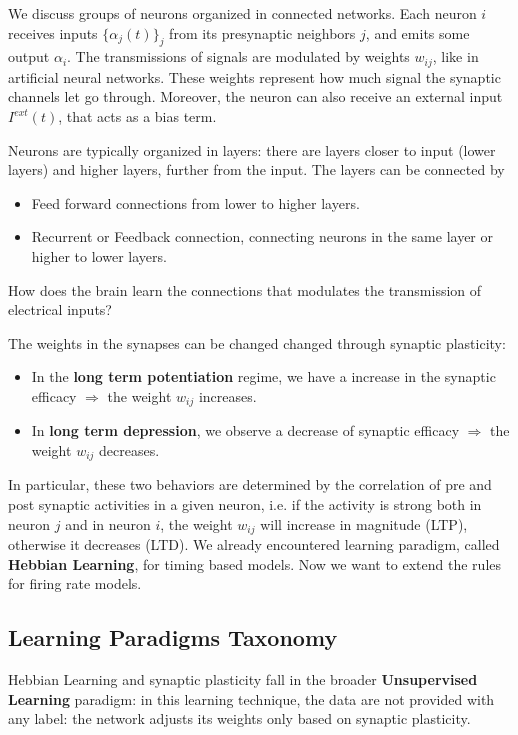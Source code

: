 \documentclass[oneside]{book}
\theoremstyle{definition}
\theoremstyle{plain}
\begin{document}
We discuss groups of neurons organized in connected networks. Each neuron $i$ receives inputs $\{\alpha_j(t)\}_{j}$ from its presynaptic neighbors $j$, and emits some output $\alpha_{i}$.
The transmissions of signals are modulated by weights $w_{ij}$, like in artificial neural networks. These weights represent how much signal the synaptic channels let go through. Moreover, the neuron can also receive an external input $I^{ext}(t)$, that acts as a bias term.

Neurons are typically organized in layers: there are layers closer to input (lower layers) and higher layers, further from the input. 
The layers can be connected by
\begin{itemize}
    \item Feed forward connections from lower to higher layers.
    \item Recurrent or Feedback connection, connecting neurons in the same layer or higher to lower layers.
\end{itemize}
How does the brain learn the connections that modulates the transmission of electrical inputs?

The weights in the synapses can be changed changed through synaptic plasticity:
\begin{itemize}
    \item In the\textbf{ long term potentiation} regime, we have a increase in the synaptic efficacy $\Rightarrow$ the weight $w_{ij}$ increases.
    \item In \textbf{long term depression}, we observe a decrease of synaptic efficacy $\Rightarrow$ the weight $w_{ij}$ decreases.

\end{itemize}
In particular, these two behaviors are determined by the correlation of pre and post synaptic activities in a given neuron, i.e. if the activity is strong both in neuron $j$ and in neuron $i$, the weight $w_{ij}$ will increase in magnitude (LTP), otherwise it decreases (LTD). We already encountered learning paradigm, called \textbf{Hebbian Learning}, for timing based models. Now we want to extend the rules for firing rate models.

\subsection{Learning Paradigms Taxonomy}

Hebbian Learning and synaptic plasticity fall in the broader \textbf{Unsupervised Learning } paradigm: in this learning technique, the data are not provided with any label: the network adjusts its weights only based on synaptic plasticity.
\end{document}
